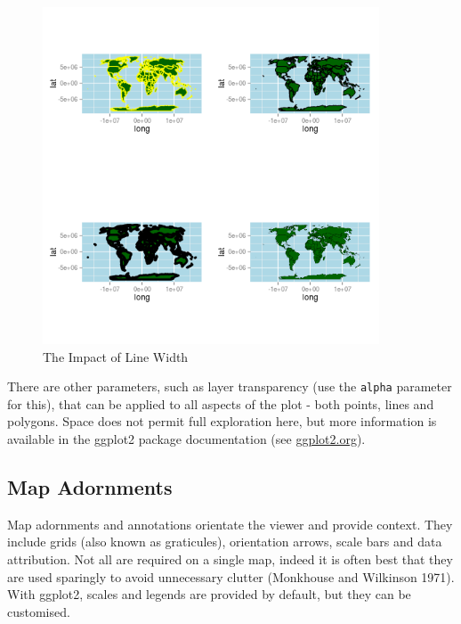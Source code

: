 \documentclass[]{article}
\let\Oldincludegraphics\includegraphics
\renewcommand{\includegraphics}[1]{\Oldincludegraphics[width=10cm]{#1}}
\begin{document}
\begin{figure}[htbp]
\centering
\includegraphics{figure/The_Impact_of_Line_Width.png}
\caption{The Impact of Line Width} \label{flinew}
\end{figure}

There are other parameters, such as layer transparency (use the
\texttt{alpha} parameter for this), that can be applied to all aspects of
the plot - both points, lines and polygons. Space does not permit full
exploration here, but more information is available in the ggplot2
package documentation (see \href{http://ggplot2.org/}{ggplot2.org}).

\subsection{Map Adornments}

Map adornments and annotations orientate the viewer and provide context.
They include grids (also known as graticules), orientation arrows, scale
bars and data attribution. Not all are required on a single map, indeed
it is often best that they are used sparingly to avoid unnecessary
clutter (Monkhouse and Wilkinson 1971). With ggplot2, scales and legends
are provided by default, but they can be customised.
\end{document}
